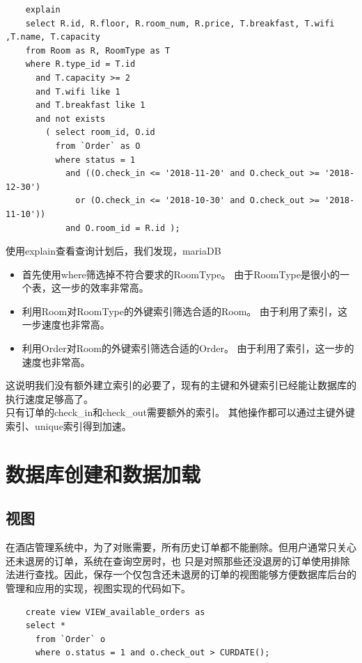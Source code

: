 \documentclass{myreport}
\begin{document}
\begin{verbatim}
    explain 
    select R.id, R.floor, R.room_num, R.price, T.breakfast, T.wifi ,T.name, T.capacity
    from Room as R, RoomType as T
    where R.type_id = T.id
      and T.capacity >= 2
      and T.wifi like 1
      and T.breakfast like 1
      and not exists
        ( select room_id, O.id
          from `Order` as O
          where status = 1
            and ((O.check_in <= '2018-11-20' and O.check_out >= '2018-12-30')
              or (O.check_in <= '2018-10-30' and O.check_out >= '2018-11-10'))
            and O.room_id = R.id );
\end{verbatim}

使用explain查看查询计划后，我们发现，mariaDB
\begin{itemize}
    \item 首先使用where筛选掉不符合要求的RoomType。
    由于RoomType是很小的一个表，这一步的效率非常高。
    \item 利用Room对RoomType的外键索引筛选合适的Room。
    由于利用了索引，这一步速度也非常高。
    \item 利用Order对Room的外键索引筛选合适的Order。
    由于利用了索引，这一步的速度也非常高。
\end{itemize}
  
这说明我们没有额外建立索引的必要了，现有的主键和外键索引已经能让数据库的执行速度足够高了。\\


只有订单的check\_in和check\_out需要额外的索引。
其他操作都可以通过主键外键索引、unique索引得到加速。


\chapter{数据库创建和数据加载}
\section{视图}
在酒店管理系统中，为了对账需要，所有历史订单都不能删除。但用户通常只关心还未退房的订单，系统在查询空房时，也
只是对照那些还没退房的订单使用排除法进行查找。因此，保存一个仅包含还未退房的订单的视图能够方便数据库后台的管理和应用的实现，视图实现的代码如下。

\begin{verbatim}
    create view VIEW_available_orders as
    select *
      from `Order` o
      where o.status = 1 and o.check_out > CURDATE();
\end{verbatim}
\end{document}
